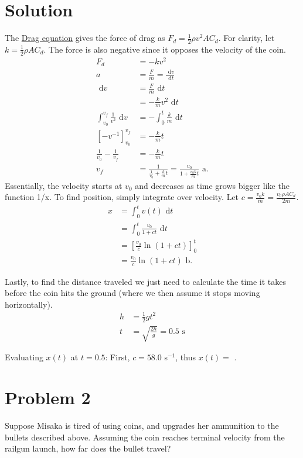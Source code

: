 \documentclass[11pt, oneside]{article}
\newcommand{\df}{\ensuremath{\text{ d}}}
\begin{document}
\section{Solution}

The \href{https://en.wikipedia.org/wiki/Drag_equation}{Drag equation}
gives the force of drag as \( F_d = \frac{1}{2} \rho v^2 A C_d \).
For clarity, let \( k = \frac{1}{2} \rho A C_d \).
The force is also negative since it opposes the velocity of the coin.
\begin{align*}
    F_d &= -kv^2 \\
    a &= \frac{F}{m} = \frac{\df v}{\df t} \\
    \df v &= \frac{F}{m} \df t \\
          &= -\frac{k}{m}v^2 \df t \\
    \int^{v_f}_{v_0} \frac{1}{v^2} \df v &= -\int^t_0 \frac{k}{m} \df t \\
    [ -v^{-1} ]^{v_f}_{v_0} &= -\frac{k}{m} t \\
    \frac{1}{v_0} - \frac{1}{v_f} &= -\frac{k}{m} t \\
    v_f &= \frac{1}{\frac{1}{v_0} + \frac{k}{m} t} = \boxed{\frac{v_0}{1 + \frac{v_0 k}{m} t}} \text{ a.}
\end{align*}
Essentially, the velocity starts at \( v_0 \) and decreases as time grows bigger
like the function 1/x. To find position, simply integrate over velocity.
Let \( c = \frac{v_0 k}{m} = \frac{v_0 \rho A C_d}{2m} \).
\begin{align*}
    x &= \int^t_0 v(t) \df t \\
      &= \int^t_0 \frac{v_0}{1 + ct} \df t \\
      &= [\frac{v_0}{c} \ln (1 + ct)]^t_0 \\
      &= \boxed{\frac{v_0}{c} \ln(1 + ct)} \text{ b.}
\end{align*}

Lastly, to find the distance traveled we just need to calculate the 
time it takes before the coin hits the ground
(where we then assume it stops moving horizontally).
\begin{align*}
    h &= \frac{1}{2} gt^2 \\
    t &= \sqrt{\frac{2h}{g}} = 0.5 \text{ s} 
\end{align*}

Evaluating \( x(t) \) at \( t = 0.5 \):
First, \( c = 58.0 \) s\(^{-1}\), thus \( x(t) = \) . \newline

\section{Problem 2}
Suppose Misaka is tired of using coins, and upgrades her ammunition to 
the bullets described above. Assuming the coin reaches terminal velocity
from the railgun launch, how far does the bullet travel?
\end{document}
